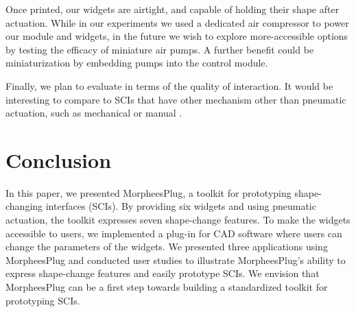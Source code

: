     Once printed, our widgets are airtight, and capable of holding their shape
    after actuation. While in our experiments we used a dedicated air compressor
    to power our module and widgets, in the future we wish to explore
    more-accessible options by testing the efficacy of miniature air pumps. A
    further benefit could be miniaturization by embedding pumps into the control
    module.
      
    Finally, we plan to evaluate \mp in terms of the quality of interaction. It
    would be interesting to compare \mp to SCIs that have other mechanism other
    than pneumatic actuation, such as mechanical \cite{Abtahi:2018a} 
    or manual \cite{McClelland:2017}.

  \section{Conclusion}
    In this paper, we presented MorpheesPlug, a toolkit for prototyping
    shape-changing interfaces (SCIs). By providing six widgets and using
    pneumatic actuation, the toolkit expresses seven shape-change features. To
    make the widgets accessible to users, we implemented a plug-in for CAD
    software where users can change the parameters of the widgets. We presented
    three applications using MorpheesPlug and conducted user studies to
    illustrate MorpheesPlug's ability to express shape-change features and
    easily prototype SCIs.  We envision that MorpheesPlug can be a first step
    towards building a standardized toolkit for prototyping SCIs.